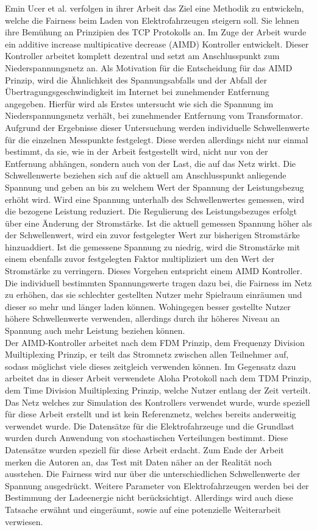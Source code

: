 Emin Ucer et al. verfolgen in ihrer Arbeit \cite{RWTCP} das Ziel eine Methodik zu entwickeln, welche die Fairness beim Laden von Elektrofahrzeugen steigern soll. Sie lehnen ihre Bemühung an Prinzipien des TCP Protokolls an.  Im Zuge der Arbeit wurde ein additive increase multipicative decrease (AIMD) Kontroller entwickelt. Dieser Kontroller arbeitet komplett dezentral und setzt am Anschlusspunkt zum Niederspannungsnetz an. Als Motivation für die Entscheidung für das AIMD Prinzip, wird die Ähnlichkeit des Spannungsabfalls und der Abfall der Übertragungsgeschwindigkeit im Internet bei zunehmender Entfernung angegeben. Hierfür wird als Erstes untersucht wie sich die Spannung im Niederspannungsnetz verhält, bei zunehmender Entfernung vom Transformator. Aufgrund der Ergebnisse dieser Untersuchung werden individuelle Schwellenwerte für die einzelnen Messpunkte festgelegt. Diese werden allerdings nicht nur einmal bestimmt, da sie, wie in der Arbeit festgestellt wird, nicht nur von der Entfernung abhängen, sondern auch von der Last, die auf das Netz wirkt. Die Schwellenwerte beziehen sich auf die aktuell am Anschlusspunkt anliegende Spannung und geben an bis zu welchem Wert der Spannung der Leistungsbezug erhöht wird. Wird eine Spannung unterhalb des Schwellenwertes gemessen, wird die bezogene Leistung reduziert. Die Regulierung des Leistungsbezuges erfolgt über eine Änderung der Stromstärke. Ist die aktuell gemessen Spannung höher als der Schwellenwert, wird ein zuvor festgelegter Wert zur bisherigen Stromstärke hinzuaddiert. Ist die gemessene Spannung zu niedrig, wird die Stromstärke mit einem ebenfalls zuvor festgelegten Faktor multipliziert um den Wert der Stromstärke zu verringern. Dieses Vorgehen entspricht einem AIMD Kontroller. Die individuell bestimmten Spannungswerte tragen dazu bei, die Fairness im Netz zu erhöhen, das sie schlechter gestellten Nutzer mehr Spielraum einräumen und dieser so mehr und länger laden können. Wohingegen besser gestellte Nutzer höhere Schwellenwerte verwenden, allerdings durch ihr höheres Niveau an Spannung auch mehr Leistung beziehen können.\\
Der AIMD-Kontroller arbeitet nach dem FDM Prinzip, dem Frequenzy Division Muiltiplexing Prinzip, er teilt das Stromnetz zwischen allen Teilnehmer auf, sodass möglichst viele dieses zeitgleich verwenden können. Im Gegensatz dazu arbeitet das in dieser Arbeit verwendete Aloha Protokoll nach dem TDM Prinzip, dem Time Division Muiltiplexing Prinzip, welche Nutzer entlang der Zeit verteilt. Das Netz welches zur Simulation des Kontrollers verwendet wurde, wurde speziell für diese Arbeit erstellt und ist kein Referenznetz, welches bereits anderweitig verwendet wurde. Die Datensätze für die Elektrofahrzeuge und die Grundlast wurden durch Anwendung von stochastischen Verteilungen bestimmt. Diese Datensätze wurden speziell für diese Arbeit erdacht. Zum Ende der Arbeit merken die Autoren an, das Test mit Daten näher an der Realität noch ausstehen. Die Fairness wird nur über die unterschiedlichen Schwellenwerte der Spannung ausgedrückt. Weitere Parameter von Elektrofahrzeugen werden bei der Bestimmung der Ladeenergie nicht berücksichtigt. Allerdings wird auch diese Tatsache erwähnt und eingeräumt, sowie auf eine potenzielle Weiterarbeit verwiesen. 
